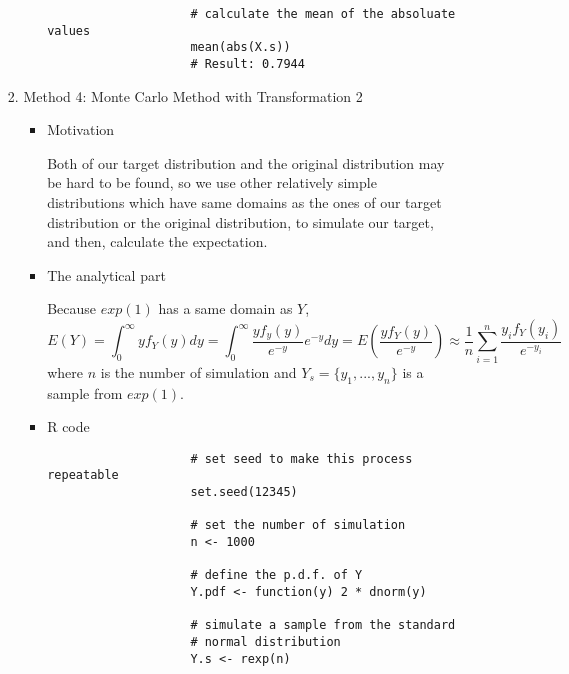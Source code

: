 \begin{enumerate}
\begin{enumerate}
\begin{enumerate}
\begin{itemize}
\begin{verbatim}
					# calculate the mean of the absoluate values
					mean(abs(X.s))
					# Result: 0.7944
					\end{verbatim}
				\end{itemize}
				\item Method 4: Monte Carlo Method with Transformation 2
				\begin{itemize}
					\item Motivation
					\par Both of our target distribution and the original distribution may be hard to be found, so we use other relatively simple distributions which have same domains as the ones of our target distribution or the original distribution, to simulate our target, and then, calculate the expectation.
					\item 
				\par The analytical part
				\par Because $exp(1)$ has a same domain as $Y$, 
				\begin{equation*}
				E(Y) = \int_{0}^{\infty}yf_Y(y)dy = \int_{0}^{\infty}\frac{yf_y(y)}{e^{-y}}e^{-y}dy = E(\frac{yf_Y(y)}{e^{-y}}) \approx \frac{1}{n}\sum_{i=1}^{n}\frac{y_if_Y(y_i)}{e^{-y_i}}
				\end{equation*}
				where $n$ is the number of simulation and $Y_s = \{y_1, ..., y_n\}$ is a sample from $exp(1)$.
				
					\item R code
					\begin{verbatim}
					# set seed to make this process repeatable
					set.seed(12345)
					
					# set the number of simulation
					n <- 1000
					
					# define the p.d.f. of Y
					Y.pdf <- function(y) 2 * dnorm(y)
					
					# simulate a sample from the standard 
					# normal distribution
					Y.s <- rexp(n)
					

\end{verbatim}
\end{itemize}
\end{enumerate}
\end{enumerate}
\end{enumerate}
